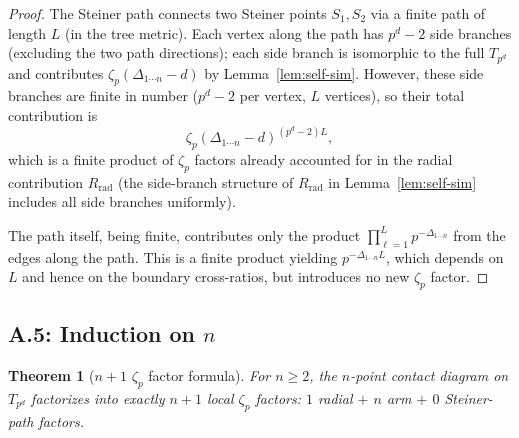 \documentclass[11pt,a4paper]{article}
\newtheorem{theorem}{Theorem}
\begin{document}
\begin{proof}
The Steiner path connects two Steiner points $S_1, S_2$ via a finite path of length $L$ (in the tree metric). Each vertex along the path has $p^d - 2$ side branches (excluding the two path directions); each side branch is isomorphic to the full $T_{p^d}$ and contributes $\zeta_p(\Delta_{1\cdots n} - d)$ by Lemma~\ref{lem:self-sim}. However, these side branches are finite in number ($p^d - 2$ per vertex, $L$ vertices), so their total contribution is
\begin{equation}
\zeta_p(\Delta_{1\cdots n} - d)^{(p^d - 2) L},
\end{equation}
which is a finite product of $\zeta_p$ factors already accounted for in the radial contribution $R_{\mathrm{rad}}$ (the side-branch structure of $R_{\mathrm{rad}}$ in Lemma~\ref{lem:self-sim} includes all side branches uniformly).

The path itself, being finite, contributes only the product $\prod_{\ell=1}^L p^{-\Delta_{1\cdots n}}$ from the edges along the path. This is a finite product yielding $p^{-\Delta_{1\cdots n} L}$, which depends on $L$ and hence on the boundary cross-ratios, but introduces no new $\zeta_p$ factor. \qedhere
\end{proof}

\subsection{A.5: Induction on $n$}

\begin{theorem}[$n{+}1$ $\zeta_p$ factor formula]
\label{thm:nplus1}
For $n \geq 2$, the $n$-point contact diagram on $T_{p^d}$ factorizes into exactly $n{+}1$ local $\zeta_p$ factors: $1$ radial $+$ $n$ arm $+$ $0$ Steiner-path factors.
\end{theorem}
\end{document}
